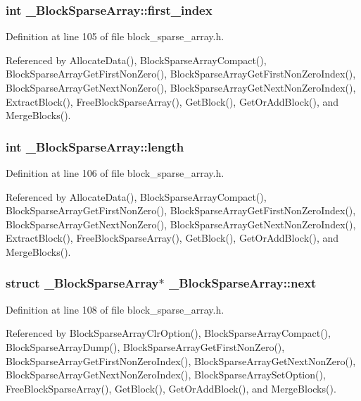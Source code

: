 \subsubsection{\setlength{\rightskip}{0pt plus 5cm}int \bf{\_\-Block\-Sparse\-Array::first\_\-index}}\label{struct__BlockSparseArray_4065a11ad303e9547a0cebf7e5c8760d}




Definition at line 105 of file block\_\-sparse\_\-array.h.

Referenced by Allocate\-Data(), Block\-Sparse\-Array\-Compact(), Block\-Sparse\-Array\-Get\-First\-Non\-Zero(), Block\-Sparse\-Array\-Get\-First\-Non\-Zero\-Index(), Block\-Sparse\-Array\-Get\-Next\-Non\-Zero(), Block\-Sparse\-Array\-Get\-Next\-Non\-Zero\-Index(), Extract\-Block(), Free\-Block\-Sparse\-Array(), Get\-Block(), Get\-Or\-Add\-Block(), and Merge\-Blocks().
\subsubsection{\setlength{\rightskip}{0pt plus 5cm}int \bf{\_\-Block\-Sparse\-Array::length}}\label{struct__BlockSparseArray_0ef52bbc96d1e44677700a3dfcf56c12}




Definition at line 106 of file block\_\-sparse\_\-array.h.

Referenced by Allocate\-Data(), Block\-Sparse\-Array\-Compact(), Block\-Sparse\-Array\-Get\-First\-Non\-Zero(), Block\-Sparse\-Array\-Get\-First\-Non\-Zero\-Index(), Block\-Sparse\-Array\-Get\-Next\-Non\-Zero(), Block\-Sparse\-Array\-Get\-Next\-Non\-Zero\-Index(), Extract\-Block(), Free\-Block\-Sparse\-Array(), Get\-Block(), Get\-Or\-Add\-Block(), and Merge\-Blocks().
\subsubsection{\setlength{\rightskip}{0pt plus 5cm}struct \bf{\_\-Block\-Sparse\-Array}$\ast$ \bf{\_\-Block\-Sparse\-Array::next}}\label{struct__BlockSparseArray_05dfaf4b5b36d22ea38638d779b0e77b}




Definition at line 108 of file block\_\-sparse\_\-array.h.

Referenced by Block\-Sparse\-Array\-Clr\-Option(), Block\-Sparse\-Array\-Compact(), Block\-Sparse\-Array\-Dump(), Block\-Sparse\-Array\-Get\-First\-Non\-Zero(), Block\-Sparse\-Array\-Get\-First\-Non\-Zero\-Index(), Block\-Sparse\-Array\-Get\-Next\-Non\-Zero(), Block\-Sparse\-Array\-Get\-Next\-Non\-Zero\-Index(), Block\-Sparse\-Array\-Set\-Option(), Free\-Block\-Sparse\-Array(), Get\-Block(), Get\-Or\-Add\-Block(), and Merge\-Blocks().
